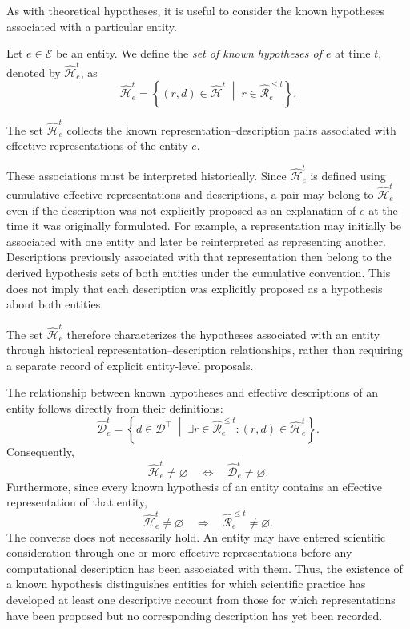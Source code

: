 As with theoretical hypotheses, it is useful to consider the known hypotheses associated with a particular entity.

\begin{definition}
\label{def:known_hypotheses_entity}
Let $e\in\mathcal{E}$ be an entity. We define the \emph{set of known hypotheses of $e$} at time $t$, denoted by $\hat{\mathcal{H}}_e^t$, as
\[
\hat{\mathcal{H}}_e^t = \left\{(r,d)\in\hat{\mathcal{H}}^t \;\middle|\;
r\in\hat{\mathcal{R}}_e^{\leq t} \right\}.
\]
\end{definition}

The set $\hat{\mathcal{H}}_e^t$ collects the known representation--description pairs associated with effective representations of the entity $e$.

These associations must be interpreted historically. Since $\hat{\mathcal{H}}_e^t$ is defined using cumulative effective representations and descriptions, a pair may belong to $\hat{\mathcal{H}}_e^t$ even if the description was not explicitly proposed as an explanation of $e$ at the time it was originally formulated. For example, a representation may initially be associated with one entity and later be reinterpreted as representing another. Descriptions previously associated with that representation then belong to the derived hypothesis sets of both entities under the cumulative convention. This does not imply that each description was explicitly proposed as a hypothesis about both entities.

The set $\hat{\mathcal{H}}_e^t$ therefore characterizes the hypotheses associated with an entity through historical representation--description relationships, rather than requiring a separate record of explicit entity-level proposals.

The relationship between known hypotheses and effective descriptions of an entity follows directly from their definitions:
\[
\hat{\mathcal{D}}_e^t = \left\{d\in\mathcal{D}^\top \;\middle|\;
\exists r\in\hat{\mathcal{R}}_e^{\leq t}: (r,d)\in\hat{\mathcal{H}}_e^t \right\}.
\]
Consequently,
\[
\hat{\mathcal{H}}_e^t\neq\varnothing \quad\Longleftrightarrow\quad \hat{\mathcal{D}}_e^t\neq\varnothing.
\]
Furthermore, since every known hypothesis of an entity contains an effective representation of that entity,
\[
\hat{\mathcal{H}}_e^t\neq\varnothing \quad\Longrightarrow\quad \hat{\mathcal{R}}_e^{\leq t}\neq\varnothing.
\]
The converse does not necessarily hold. An entity may have entered scientific consideration through one or more effective representations before any computational description has been associated with them. Thus, the existence of a known hypothesis distinguishes entities for which scientific practice has developed at least one descriptive account from those for which representations have been proposed but no corresponding description has yet been recorded.

